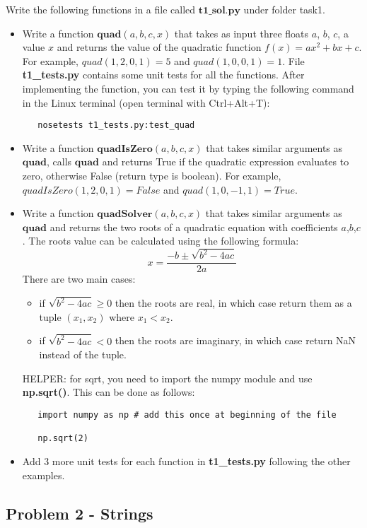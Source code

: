 \documentclass[11pt,a4paper]{report}
\begin{document}
Write the following functions in a file called $\textbf{t1\_sol.py}$ under folder task1.
\begin{itemize}
 \item Write a function $\textbf{quad}(a, b, c, x)$ that takes as input three floats $a$, $b$, $c$, a value $x$ and returns the value of the quadratic function $f(x) = ax^2 +bx +c$. For example, $quad(1,2,0,1) = 5$ and $quad(1,0,0,1) = 1$. File \textbf{t1\_tests.py} contains some unit tests for all the functions. After implementing the function, you can test it by typing the following command in the Linux terminal (open terminal with Ctrl+Alt+T):
  \begin{lstlisting}
   nosetests t1_tests.py:test_quad
  \end{lstlisting}
 \item Write a function $\textbf{quadIsZero}(a, b, c, x)$ that takes similar arguments as $\textbf{quad}$, calls $\textbf{quad}$ and returns True if the quadratic expression evaluates to zero, otherwise False (return type is boolean). For example, $quadIsZero(1,2,0,1) = False$ and $quad(1,0,-1,1) = True$. 
 \item Write a function $\textbf{quadSolver}(a, b, c, x)$ that takes similar arguments as $\textbf{quad}$ and returns the two roots of a quadratic equation with coefficients $a$,$b$,$c$. The roots value can be calculated using the following formula:
 $$ x = \frac{-b \pm \sqrt{b^2 - 4ac}}{2a}$$
 There are two main cases:
 \begin{itemize}
  \item if $\sqrt{b^2 - 4ac} \ge 0 $ then the roots are real, in which case return them as a tuple $(x_1,x_2)$ where $x_1 < x_2$. 
  \item if $\sqrt{b^2 - 4ac} < 0 $ then the roots are imaginary, in which case return NaN instead of the tuple.
 \end{itemize}
 HELPER: for sqrt, you need to import the numpy module and use \textbf{np.sqrt()}. This can be done as follows:
   \begin{lstlisting}
   import numpy as np # add this once at beginning of the file
   
   np.sqrt(2)
  \end{lstlisting}
 \item Add 3 more unit tests for each function in \textbf{t1\_tests.py} following the other examples.
\end{itemize}

\subsection*{Problem 2 - Strings}
\end{document}
